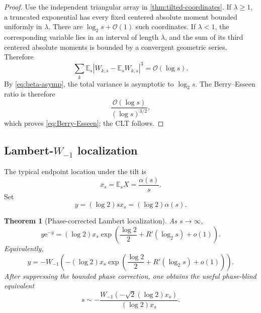 \documentclass[11pt,oneside]{article}
\newtheorem{theorem}{Theorem}[section]
\theoremstyle{definition}
\theoremstyle{remark}
\newcommand{\e}{\mathrm e}
\newcommand{\E}{\mathbb E}
\newcommand{\bigO}{\mathcal O}
\newcommand{\smallo}{o}
\begin{document}
\begin{proof}
Use the independent triangular array in \cref{thm:tilted-coordinates}.  If
$\lambda\ge1$, a truncated exponential has every fixed centered absolute
moment bounded uniformly in $\lambda$.  There are $\log_2s+\bigO(1)$ such
coordinates.  If $\lambda<1$, the corresponding variable lies in an interval
of length $\lambda$, and the sum of its third centered absolute moments is
bounded by a convergent geometric series.  Therefore
\begin{equation}\label{eq:third-abs-sum}
 \sum_k\E_s|W_{k,s}-\E_sW_{k,s}|^3=\bigO(\log s).
\end{equation}
By \cref{eq:beta-asymp}, the total variance is asymptotic to $\log_2s$.
The Berry--Esseen ratio is therefore
\[
 \frac{\bigO(\log s)}{(\log s)^{3/2}},
\]
which proves \cref{eq:Berry-Esseen}; the CLT follows.
\end{proof}

\subsection{Lambert-$W_{-1}$ localization}

The typical endpoint location under the tilt is
\begin{equation}\label{eq:xs}
 x_s=\E_sX=\frac{\alpha(s)}s.
\end{equation}
Set
\begin{equation}\label{eq:y-def}
 y=(\log2)sx_s=(\log2)\alpha(s).
\end{equation}

\begin{theorem}[Phase-corrected Lambert localization]\label{thm:Lambert-localization}
As $s\to\infty$,
\begin{equation}\label{eq:y-Lambert-implicit}
 y\e^{-y}=(\log2)x_s
 \exp\!\left(\frac{\log2}{2}+R'(\log_2s)+\smallo(1)\right).
\end{equation}
Equivalently,
\begin{equation}\label{eq:y-W}
 \boxed{
 y=-W_{-1}\!\left(-(
 \log2)x_s\exp\!\left(\frac{\log2}{2}+R'(\log_2s)+\smallo(1)\right)
 \right).}
\end{equation}
After suppressing the bounded phase correction, one obtains the useful
phase-blind equivalent
\begin{equation}\label{eq:s-W-leading}
 s\sim
 -\frac{W_{-1}(-\sqrt2(\log2)x_s)}{(\log2)x_s}.
\end{equation}
\end{theorem}
\end{document}
